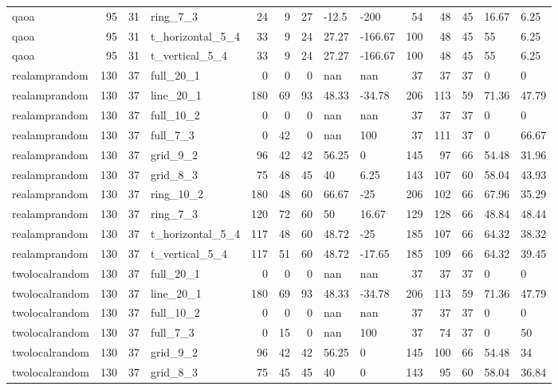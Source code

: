 \begin{longtable}{lrrlrrrllrrrll}
qaoa & 95 & 31 & ring\_7\_3 & 24 & 9 & 27 & -12.5 & -200 & 54 & 48 & 45 & 16.67 & 6.25 \\
qaoa & 95 & 31 & t\_horizontal\_5\_4 & 33 & 9 & 24 & 27.27 & -166.67 & 100 & 48 & 45 & 55 & 6.25 \\
qaoa & 95 & 31 & t\_vertical\_5\_4 & 33 & 9 & 24 & 27.27 & -166.67 & 100 & 48 & 45 & 55 & 6.25 \\
realamprandom & 130 & 37 & full\_20\_1 & 0 & 0 & 0 & nan & nan & 37 & 37 & 37 & 0 & 0 \\
realamprandom & 130 & 37 & line\_20\_1 & 180 & 69 & 93 & 48.33 & -34.78 & 206 & 113 & 59 & 71.36 & 47.79 \\
realamprandom & 130 & 37 & full\_10\_2 & 0 & 0 & 0 & nan & nan & 37 & 37 & 37 & 0 & 0 \\
realamprandom & 130 & 37 & full\_7\_3 & 0 & 42 & 0 & nan & 100 & 37 & 111 & 37 & 0 & 66.67 \\
realamprandom & 130 & 37 & grid\_9\_2 & 96 & 42 & 42 & 56.25 & 0 & 145 & 97 & 66 & 54.48 & 31.96 \\
realamprandom & 130 & 37 & grid\_8\_3 & 75 & 48 & 45 & 40 & 6.25 & 143 & 107 & 60 & 58.04 & 43.93 \\
realamprandom & 130 & 37 & ring\_10\_2 & 180 & 48 & 60 & 66.67 & -25 & 206 & 102 & 66 & 67.96 & 35.29 \\
realamprandom & 130 & 37 & ring\_7\_3 & 120 & 72 & 60 & 50 & 16.67 & 129 & 128 & 66 & 48.84 & 48.44 \\
realamprandom & 130 & 37 & t\_horizontal\_5\_4 & 117 & 48 & 60 & 48.72 & -25 & 185 & 107 & 66 & 64.32 & 38.32 \\
realamprandom & 130 & 37 & t\_vertical\_5\_4 & 117 & 51 & 60 & 48.72 & -17.65 & 185 & 109 & 66 & 64.32 & 39.45 \\
twolocalrandom & 130 & 37 & full\_20\_1 & 0 & 0 & 0 & nan & nan & 37 & 37 & 37 & 0 & 0 \\
twolocalrandom & 130 & 37 & line\_20\_1 & 180 & 69 & 93 & 48.33 & -34.78 & 206 & 113 & 59 & 71.36 & 47.79 \\
twolocalrandom & 130 & 37 & full\_10\_2 & 0 & 0 & 0 & nan & nan & 37 & 37 & 37 & 0 & 0 \\
twolocalrandom & 130 & 37 & full\_7\_3 & 0 & 15 & 0 & nan & 100 & 37 & 74 & 37 & 0 & 50 \\
twolocalrandom & 130 & 37 & grid\_9\_2 & 96 & 42 & 42 & 56.25 & 0 & 145 & 100 & 66 & 54.48 & 34 \\
twolocalrandom & 130 & 37 & grid\_8\_3 & 75 & 45 & 45 & 40 & 0 & 143 & 95 & 60 & 58.04 & 36.84 \\

\end{longtable}
